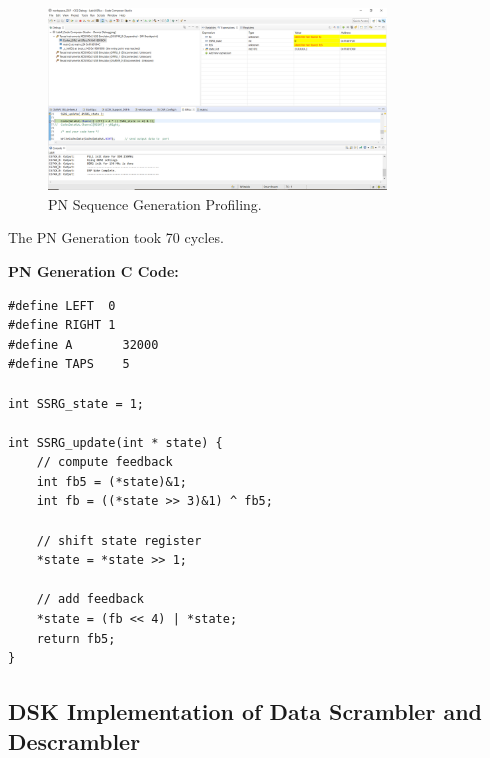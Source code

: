 \documentclass{article}
\begin{document}
\begin{figure}[h]
  \begin{center}
    \includegraphics[width=0.80\textwidth]{img/profile_PN_generation.png}
    \caption{PN Sequence Generation Profiling.}
  \end{center}
\end{figure}

The PN Generation took 70 cycles.
\newline

\textbf{PN Generation C Code:}

\begin{verbatim}
#define LEFT  0
#define RIGHT 1
#define A       32000
#define TAPS    5

int SSRG_state = 1;

int SSRG_update(int * state) {
    // compute feedback
    int fb5 = (*state)&1;
    int fb = ((*state >> 3)&1) ^ fb5;

    // shift state register
    *state = *state >> 1;

    // add feedback
    *state = (fb << 4) | *state;
    return fb5;
}
\end{verbatim}

\subsection{DSK Implementation of Data Scrambler and Descrambler}
\end{document}
